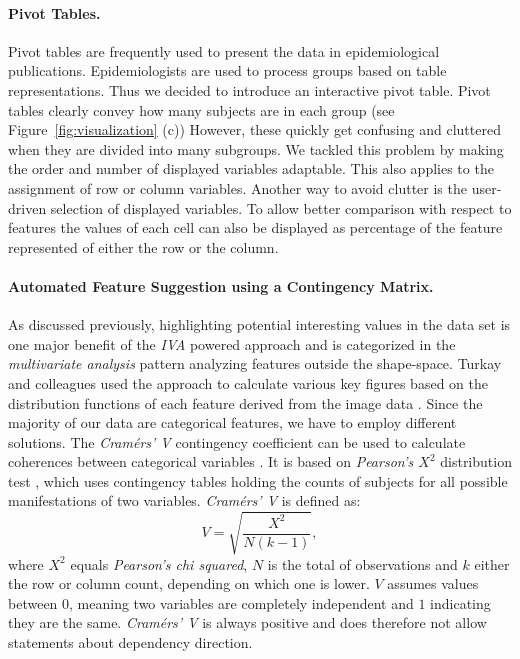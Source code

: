 \documentclass[journal]{style/vgtc} 			          %
\begin{document}
\paragraph{Pivot Tables.}
Pivot tables are frequently used to present the data in epidemiological publications.
%
Epidemiologists are used to process groups based on table representations.
%
Thus we decided to introduce an interactive pivot table.
%
Pivot tables clearly convey how many subjects are in each group (see Figure~\ref{fig:visualization} (c))
%
However, these quickly get confusing and cluttered when they are divided into many subgroups.
%
We tackled this problem by making the order and number of displayed variables adaptable.
%
This also applies to the assignment of row or column variables.
%
Another way to avoid clutter is the user-driven selection of displayed variables.
%
To allow better comparison with respect to features the values of each cell can also be displayed as percentage of the feature represented of either the row or the column.

\paragraph{Automated Feature Suggestion using a Contingency Matrix.}
As discussed previously, highlighting potential interesting values in the data set is one major benefit of the \emph{IVA} powered approach and is categorized in the \emph{multivariate analysis} pattern analyzing features outside the shape-space.
%
Turkay and colleagues used the approach to calculate various key figures based on the distribution functions of each feature derived from the image data \cite{Turkay2013}.
%
Since the majority of our data are categorical features, we have to employ different solutions.
%
The \emph{Cram\'{e}rs' V} contingency coefficient can be used to calculate coherences between categorical variables \cite{CramerV}.
%
It is based on \emph{Pearson's $X^2$} distribution test \cite{ChiSquare}, which uses contingency tables holding the counts of subjects for all possible manifestations of two variables.
%
\emph{Cram\'{e}rs' V} is defined as:
\begin{equation}
V = \sqrt{\frac{X^2}{N(k-1)}},
\end{equation}
where $X^2$ equals \emph{Pearson's chi squared}, $N$ is the total of observations and $k$ either the row or column count, depending on which one is lower.
%
$V$ assumes values between $0$, meaning two variables are completely independent and $1$ indicating they are the same.
%
\emph{Cram\'{e}rs' V} is always positive and does therefore not allow statements about dependency direction.
\end{document}
